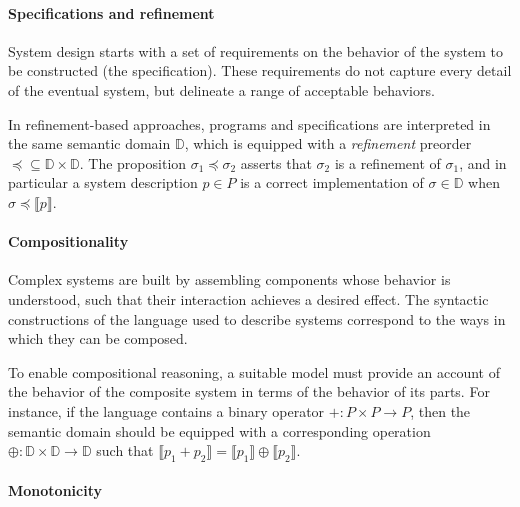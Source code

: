 \documentclass[acmsmall,authordraft]{acmart}
\newcommand{\refby}{\preceq}
\begin{document}

\paragraph{Specifications and refinement} %

System design starts with a set of requirements
on the behavior of the system to be constructed
(the specification).
These requirements do not capture every detail
of the eventual system,
but delineate a range of acceptable behaviors.

In refinement-based approaches,
programs and specifications are interpreted in the same
semantic domain $\mathbb{D}$,
which is equipped with a \emph{refinement} preorder
${\refby} \subseteq \mathbb{D} \times \mathbb{D}$.
The proposition $\sigma_1 \refby \sigma_2$
asserts that $\sigma_2$ is a refinement of $\sigma_1$,
and in particular a system description $p \in P$ is a correct implementation
of $\sigma \in \mathbb{D}$ when
$\sigma \refby \llbracket p \rrbracket$.


\paragraph{Compositionality} %

Complex systems are built by assembling components
whose behavior is understood,
such that their interaction achieves a desired effect.
The syntactic constructions of
the language used to describe systems
correspond to the ways in which they can be composed.

To enable compositional reasoning,
a suitable model must provide an account of
the behavior of the composite system
in terms of the behavior of its parts.
For instance,
if the language contains a binary operator
${+} : P \times P \rightarrow P$,
then the semantic domain should be equipped with
a corresponding operation
${\oplus} : \mathbb{D} \times \mathbb{D} \rightarrow \mathbb{D}$
such that
$\llbracket p_1 + p_2 \rrbracket =
 \llbracket p_1 \rrbracket \oplus \llbracket p_2 \rrbracket$.


\paragraph{Monotonicity} %
\end{document}
